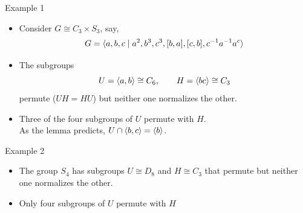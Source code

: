 \begin{frame}[fragile,label=ExampleOfPermutingIso,shrink=5]{Example 1}

  \begin{itemize}
  \item<1-> Consider $G\cong C_3 \times S_3$, say,
    \[G = \langle a,b,c \mid a^2, b^3, c^3, [b,a], [c,b], c^{-1}a^{-1}a^c\rangle\]
\item<2->The subgroups 
\[U = \langle a,b\rangle \cong C_6, \qquad H = \langle bc\rangle\cong C_3\]
permute ($UH = HU$) but neither one normalizes the other.
  \end{itemize}
\vskip4mm
  \begin{itemize}
  \item<4-> Three of the four subgroups of $U$ permute with $H$.
\\[4pt] As the lemma predicts, $U\cap \langle b, c\rangle = \langle b\rangle$.
  \end{itemize}
\end{frame}


\begin{frame}[fragile,label=ExampleOfPermutingIso,shrink=5]{Example 2}

  \begin{itemize}
  \item<1-> The group $S_4$ has subgroups $U\cong D_8$ and $H\cong C_3$ that
    permute but neither one normalizes the other.
  \end{itemize}
\vskip4mm
\begin{itemize}
\item<2-> Only four subgroups of $U$ permute with $H$%
\end{itemize}
\end{frame}


